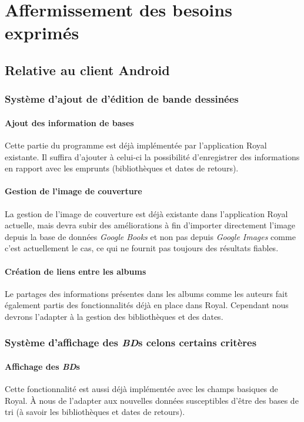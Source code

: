 \section{Affermissement des besoins exprimés} 

\subsection{Relative au client Android}
\subsubsection{Système d'ajout de d'édition de bande dessinées}

\paragraph{Ajout des information de bases}
Cette partie du programme est déjà implémentée par l'application Royal existante. 
Il suffira d'ajouter à celui-ci la possibilité d'enregistrer des informations en rapport avec les emprunts (bibliothèques et dates de retours). 

\paragraph{Gestion de l'image de couverture}
La gestion de l'image de couverture est déjà existante dans l'application Royal actuelle,
	mais devra subir des améliorations à fin d'importer directement l'image depuis la base de données \emph{Google Books} et non pas depuis \emph{Google Images} comme c'est actuellement le cas,
	ce qui ne fournit pas toujours des résultats fiables.

\paragraph{Création de liens entre les albums}	
Le partages des informations présentes dans les albums comme les auteurs fait également partis des fonctionnalités déjà en place dans Royal. 
Cependant nous devrons l'adapter à la gestion des bibliothèques et des dates. 

\subsubsection{Système d'affichage des \emph{BD}s celons certains critères}

\paragraph{Affichage des \emph{BD}s}
Cette fonctionnalité est aussi déjà implémentée avec les champs basiques de Royal.
À nous de l'adapter aux nouvelles données susceptibles d'être des bases de tri 
(à savoir les bibliothèques et dates de retours). 

